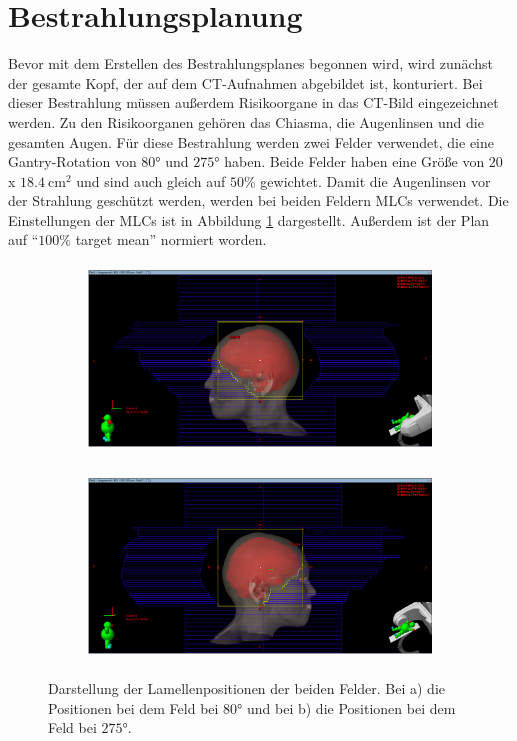 \section{Bestrahlungsplanung}
\label{sec:Bestrahlungsplanung}

Bevor mit dem Erstellen des Bestrahlungsplanes begonnen wird, wird zunächst der gesamte Kopf, der auf dem CT-Aufnahmen abgebildet ist, konturiert.
Bei dieser Bestrahlung müssen außerdem Risikoorgane in das CT-Bild eingezeichnet werden. Zu den
Risikoorganen gehören das Chiasma, die Augenlinsen und die gesamten Augen. Für diese
Bestrahlung werden zwei Felder verwendet, die eine Gantry-Rotation von $80°$ und $275°$ haben. Beide Felder haben eine Größe von $20$ x $\SI{18.4}{\centi\meter\squared}$ und sind auch gleich auf $50\%$ gewichtet. Damit die Augenlinsen vor der Strahlung geschützt werden,
werden bei beiden Feldern MLCs verwendet. Die Einstellungen der MLCs ist in Abbildung \ref{abb:MLC} dargestellt.
Außerdem ist der Plan auf \enquote{$100\%$ target mean} normiert worden.

\begin{figure}[H]
  \centering
  \begin{subfigure}{\textwidth}
    \centering
    \includegraphics[height = 5cm]{Bilder/MLC_Feld1.png}
    \caption{}
  \end{subfigure}
  \begin{subfigure}{\textwidth}
    \centering
    \includegraphics[height=5cm]{Bilder/MLC_Feld2.png}
    \caption{}
  \end{subfigure}
  \caption{Darstellung der Lamellenpositionen der beiden Felder. Bei a) die Positionen bei dem Feld bei $80°$ und bei b) die Positionen bei dem Feld bei $275°$.}
  \label{abb:MLC}
\end{figure}
